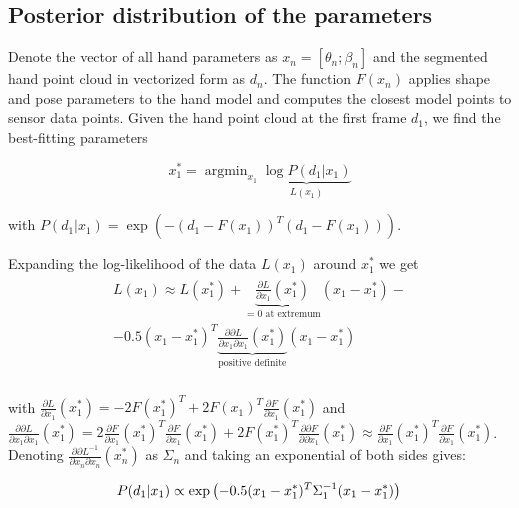 \documentclass[10pt,twocolumn,letterpaper]{article}
\begin{document}
\subsection {Posterior distribution of the parameters} \label{sec:posterior}

Denote the vector of all hand parameters as $x_n = [\theta_n; \beta_n]$ and the segmented hand point cloud in vectorized form as $d_n$. The function $F(x_n)$ applies shape and pose parameters to the hand model and computes the closest model points to sensor data points.  Given the hand point cloud at the first frame $d_1$, we find the best-fitting parameters 

\begin{equation}
x^*_1 = \operatorname{argmin}_{x_1} \underbrace{\log  P(d_1|x_1)}_{L(x_1)} 
\end{equation}

with $P(d_1|x_1) = \exp \left( - (d_1 - F(x_1))^T (d_1 - F(x_1)) \right)$.

Expanding the log-likelihood of the data $L(x_1)$ around $x_1^*$ we get
\begin{align}
\begin{split}
 L(x_1) \approx L(x_1^*) + \underbrace{\frac{\partial L}{\partial x_1}(x_1^*)}_{= 0 \text{ at extremum}}(x_1 - x_1^*) - \\
- 0.5(x_1 - x_1^*)^T \underbrace{\frac{\partial \partial L}{\partial x_1 \partial x_1}(x_1^*) }_{\text{positive definite}}  (x_1 - x_1^*) \\
\end{split}
\end{align}

with $\frac{\partial L}{\partial x_1}(x_1^*) = - 2 F(x_1^*)^T + 2 F(x_1)^T \frac{\partial F}{\partial x_1}(x_1^*)  $ and 
$\frac{\partial \partial L}{\partial x_1 \partial x_1}(x_1^*) = 2  \frac{\partial F}{\partial x_1}(x_1^*)^T  \frac{\partial F}{\partial x_1}(x_1^*) + 2 F(x_1^*)^T  \frac{\partial \partial F}{\partial \partial x_1}(x_1^*)  \approx  \frac{\partial F}{\partial x_1}(x_1^*)^T  \frac{\partial F}{\partial x_1}(x_1^*)$. Denoting $\frac{\partial \partial L^{-1}}{\partial x_n \partial x_n}(x_n^*) $ as $\Sigma_n$ and taking an exponential of both sides gives:
\vspace{-2em}

\begin{equation}
P(d_1|x_1) \propto \exp\left(- 0.5(x_1 - x_1^*)^T \Sigma_1^{-1}  (x_1 - x_1^*) \right)\\
\end{equation}
\end{document}
